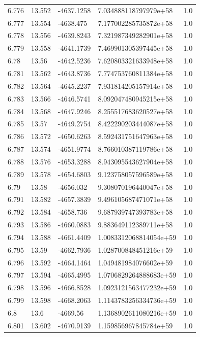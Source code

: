 \begin{tabular}{lllll}
6.776 & 13.552 & -4637.1258 & 7.034888118797979e+58 & 1.0 \\
6.777 & 13.554 & -4638.475 & 7.177002285735872e+58 & 1.0 \\
6.778 & 13.556 & -4639.8243 & 7.321987349282901e+58 & 1.0 \\
6.779 & 13.558 & -4641.1739 & 7.469901305397445e+58 & 1.0 \\
6.78 & 13.56 & -4642.5236 & 7.620803321633948e+58 & 1.0 \\
6.781 & 13.562 & -4643.8736 & 7.774753760811384e+58 & 1.0 \\
6.782 & 13.564 & -4645.2237 & 7.931814205157914e+58 & 1.0 \\
6.783 & 13.566 & -4646.5741 & 8.092047480945215e+58 & 1.0 \\
6.784 & 13.568 & -4647.9246 & 8.255517683620527e+58 & 1.0 \\
6.785 & 13.57 & -4649.2754 & 8.422290203444087e+58 & 1.0 \\
6.786 & 13.572 & -4650.6263 & 8.592431751647963e+58 & 1.0 \\
6.787 & 13.574 & -4651.9774 & 8.766010387119786e+58 & 1.0 \\
6.788 & 13.576 & -4653.3288 & 8.943095543627904e+58 & 1.0 \\
6.789 & 13.578 & -4654.6803 & 9.123758057596589e+58 & 1.0 \\
6.79 & 13.58 & -4656.032 & 9.308070196440047e+58 & 1.0 \\
6.791 & 13.582 & -4657.3839 & 9.496105687471071e+58 & 1.0 \\
6.792 & 13.584 & -4658.736 & 9.687939747393783e+58 & 1.0 \\
6.793 & 13.586 & -4660.0883 & 9.883649112389711e+58 & 1.0 \\
6.794 & 13.588 & -4661.4409 & 1.0083312068814054e+59 & 1.0 \\
6.795 & 13.59 & -4662.7936 & 1.028700848451216e+59 & 1.0 \\
6.796 & 13.592 & -4664.1464 & 1.049481984076602e+59 & 1.0 \\
6.797 & 13.594 & -4665.4995 & 1.0706829264888683e+59 & 1.0 \\
6.798 & 13.596 & -4666.8528 & 1.0923121563477232e+59 & 1.0 \\
6.799 & 13.598 & -4668.2063 & 1.1143783256334736e+59 & 1.0 \\
6.8 & 13.6 & -4669.56 & 1.1368902611080216e+59 & 1.0 \\
6.801 & 13.602 & -4670.9139 & 1.159856967845784e+59 & 1.0 \\

\end{tabular}
